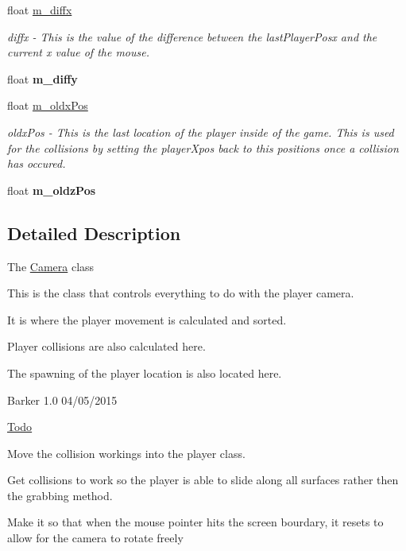 \begin{DoxyCompactItemize}
\item 
float \hyperlink{classCamera_a63dbd0a2de940897c695839473b7cdd3}{m\_\-diffx}
\begin{DoxyCompactList}\small\item\em diffx -\/ This is the value of the difference between the lastPlayerPosx and the current x value of the mouse. \item\end{DoxyCompactList}\item 
\hypertarget{classCamera_a521e35e790fe8cbe13d9f6fa99d0d61d}{
float {\bfseries m\_\-diffy}}
\label{classCamera_a521e35e790fe8cbe13d9f6fa99d0d61d}

\item 
float \hyperlink{classCamera_a26a53c2caa3c9eedf69b128b9280bd8f}{m\_\-oldxPos}
\begin{DoxyCompactList}\small\item\em oldxPos -\/ This is the last location of the player inside of the game. This is used for the collisions by setting the playerXpos back to this positions once a collision has occured. \item\end{DoxyCompactList}\item 
\hypertarget{classCamera_a04bde640b9b8ebfddfd843c0102512ae}{
float {\bfseries m\_\-oldzPos}}
\label{classCamera_a04bde640b9b8ebfddfd843c0102512ae}

\end{DoxyCompactItemize}


\subsection{Detailed Description}
The \hyperlink{classCamera}{Camera} class
\begin{DoxyItemize}
\item This is the class that controls everything to do with the player camera.
\item It is where the player movement is calculated and sorted.
\item Player collisions are also calculated here.
\item The spawning of the player location is also located here. 
\end{DoxyItemize}Barker  1.0 04/05/2015 \begin{Desc}
\item[\hyperlink{todo__todo000004}{Todo}]
\begin{DoxyItemize}
\item Move the collision workings into the player class.
\item Get collisions to work so the player is able to slide along all surfaces rather then the grabbing method.
\item Make it so that when the mouse pointer hits the screen bourdary, it resets to allow for the camera to rotate freely 
\end{DoxyItemize}\end{Desc}


